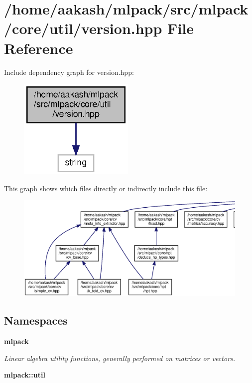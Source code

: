 \section{/home/aakash/mlpack/src/mlpack/core/util/version.hpp File Reference}
\label{src_2mlpack_2core_2util_2version_8hpp}
Include dependency graph for version.\+hpp\+:
\nopagebreak
\begin{figure}[H]
\begin{center}
\leavevmode
\includegraphics[width=157pt]{src_2mlpack_2core_2util_2version_8hpp__incl}
\end{center}
\end{figure}
This graph shows which files directly or indirectly include this file\+:
\nopagebreak
\begin{figure}[H]
\begin{center}
\leavevmode
\includegraphics[width=350pt]{src_2mlpack_2core_2util_2version_8hpp__dep__incl}
\end{center}
\end{figure}
\subsection*{Namespaces}
\begin{DoxyCompactItemize}
\item 
 \textbf{ mlpack}
\begin{DoxyCompactList}\small\item\em Linear algebra utility functions, generally performed on matrices or vectors. \end{DoxyCompactList}\item 
 \textbf{ mlpack\+::util}
\end{DoxyCompactItemize}
